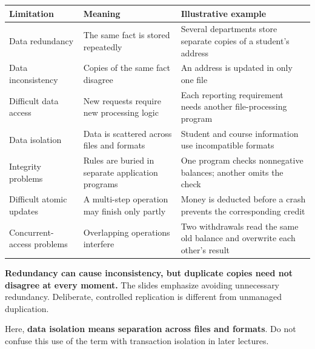 \begin{longtable}[]{@{}
  >{\raggedright\arraybackslash}p{}
  >{\raggedright\arraybackslash}p{}
  >{\raggedright\arraybackslash}p{}@{}}
\toprule\noalign{}
\begin{minipage}[b]{\linewidth}\raggedright
Limitation
\end{minipage} & \begin{minipage}[b]{\linewidth}\raggedright
Meaning
\end{minipage} & \begin{minipage}[b]{\linewidth}\raggedright
Illustrative example
\end{minipage} \\
\midrule\noalign{}
\endhead
\bottomrule\noalign{}
\endlastfoot
Data redundancy & The same fact is stored repeatedly & Several departments store separate copies of a student's address \\
Data inconsistency & Copies of the same fact disagree & An address is updated in only one file \\
Difficult data access & New requests require new processing logic & Each reporting requirement needs another file-processing program \\
Data isolation & Data is scattered across files and formats & Student and course information use incompatible formats \\
Integrity problems & Rules are buried in separate application programs & One program checks nonnegative balances; another omits the check \\
Difficult atomic updates & A multi-step operation may finish only partly & Money is deducted before a crash prevents the corresponding credit \\
Concurrent-access problems & Overlapping operations interfere & Two withdrawals read the same old balance and overwrite each other's result \\
\end{longtable}

\textbf{Redundancy can cause inconsistency, but duplicate copies need not disagree at every moment.} The slides emphasize avoiding unnecessary redundancy. Deliberate, controlled replication is different from unmanaged duplication.

Here, \textbf{data isolation means separation across files and formats}. Do not confuse this use of the term with transaction isolation in later lectures.

